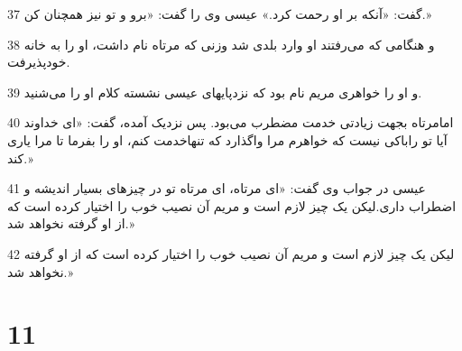 \par 37 گفت: «آنکه بر او رحمت کرد.» عیسی وی را گفت: «برو و تو نیز همچنان کن.»
\par 38 و هنگامی که می‌رفتند او وارد بلدی شد وزنی که مرتاه نام داشت، او را به خانه خودپذیرفت.
\par 39 و او را خواهری مریم نام بود که نزدپایهای عیسی نشسته کلام او را می‌شنید.
\par 40 امامرتاه بجهت زیادتی خدمت مضطرب می‌بود. پس نزدیک آمده، گفت: «ای خداوند آیا تو راباکی نیست که خواهرم مرا واگذارد که تنهاخدمت کنم، او را بفرما تا مرا یاری کند.»
\par 41 عیسی در جواب وی گفت: «ای مرتاه، ای مرتاه تو در چیزهای بسیار اندیشه و اضطراب داری.لیکن یک چیز لازم است و مریم آن نصیب خوب را اختیار کرده است که از او گرفته نخواهد شد.»
\par 42 لیکن یک چیز لازم است و مریم آن نصیب خوب را اختیار کرده است که از او گرفته نخواهد شد.»

\chapter{11}

